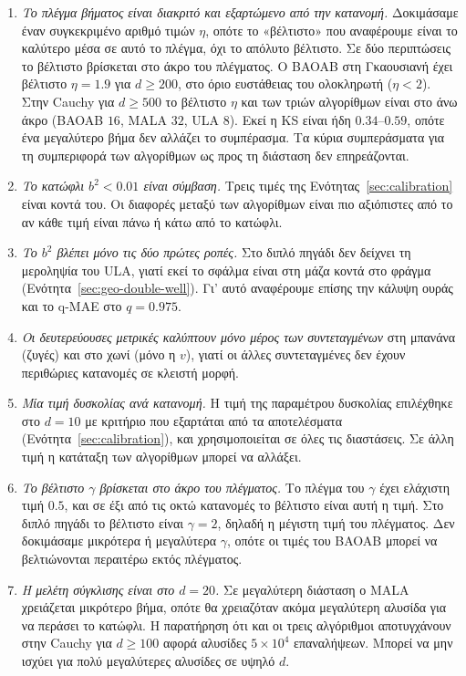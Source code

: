 \begin{enumerate}
  \item \emph{Το πλέγμα βήματος είναι διακριτό και εξαρτώμενο από την κατανομή.} Δοκιμάσαμε έναν
        συγκεκριμένο αριθμό τιμών $\eta$, οπότε το «βέλτιστο» που αναφέρουμε
        είναι το καλύτερο μέσα σε αυτό το πλέγμα, όχι το απόλυτο βέλτιστο.
        Σε δύο περιπτώσεις το βέλτιστο βρίσκεται στο άκρο του πλέγματος. Ο
        BAOAB στη Γκαουσιανή έχει βέλτιστο $\eta = 1.9$ για $d \ge 200$, στο
        όριο ευστάθειας του ολοκληρωτή ($\eta < 2$). Στην Cauchy για
        $d \ge 500$ το βέλτιστο $\eta$ και των τριών αλγορίθμων είναι στο
        άνω άκρο (BAOAB $16$, MALA $32$, ULA $8$). Εκεί η KS είναι ήδη
        $0.34$--$0.59$, οπότε ένα μεγαλύτερο βήμα δεν αλλάζει το συμπέρασμα.
        Τα κύρια συμπεράσματα για τη συμπεριφορά των αλγορίθμων ως προς τη
        διάσταση δεν επηρεάζονται.

  \item \emph{Το κατώφλι $b^2 < 0.01$ είναι σύμβαση.} Τρεις τιμές της
        Ενότητας~\ref{sec:calibration} είναι κοντά του. Οι διαφορές μεταξύ
        των αλγορίθμων είναι πιο αξιόπιστες από το αν κάθε τιμή είναι πάνω ή κάτω από το
        κατώφλι.

  \item \emph{Το $b^2$ βλέπει μόνο τις δύο πρώτες ροπές.} Στο διπλό πηγάδι δεν
        δείχνει τη μεροληψία του ULA, γιατί εκεί το σφάλμα είναι στη μάζα κοντά στο
        φράγμα (Ενότητα~\ref{sec:geo-double-well}). Γι' αυτό αναφέρουμε επίσης την
        κάλυψη ουράς και το q-MAE στο $q=0.975$.

  \item \emph{Οι δευτερεύουσες μετρικές καλύπτουν μόνο μέρος των συντεταγμένων} στη
        μπανάνα (ζυγές) και στο χωνί (μόνο η $v$), γιατί οι άλλες συντεταγμένες δεν
        έχουν περιθώριες κατανομές σε κλειστή μορφή.

  \item \emph{Μία τιμή δυσκολίας ανά κατανομή.} Η τιμή της παραμέτρου δυσκολίας
        επιλέχθηκε στο $d=10$ με κριτήριο που εξαρτάται από τα αποτελέσματα
        (Ενότητα~\ref{sec:calibration}), και χρησιμοποιείται σε όλες τις διαστάσεις.
        Σε άλλη τιμή η κατάταξη των αλγορίθμων μπορεί να αλλάξει.

  \item \emph{Το βέλτιστο $\gamma$ βρίσκεται στο άκρο του πλέγματος.} Το πλέγμα του $\gamma$
        έχει ελάχιστη τιμή $0.5$, και σε έξι από τις οκτώ κατανομές το βέλτιστο είναι
        αυτή η τιμή. Στο διπλό πηγάδι το βέλτιστο είναι $\gamma=2$, δηλαδή η μέγιστη
        τιμή του πλέγματος. Δεν δοκιμάσαμε μικρότερα
        ή μεγαλύτερα $\gamma$, οπότε οι τιμές του BAOAB μπορεί να βελτιώνονται
        περαιτέρω εκτός πλέγματος.

  \item \emph{Η μελέτη σύγκλισης είναι στο $d=20$.} Σε μεγαλύτερη διάσταση ο MALA χρειάζεται μικρότερο βήμα,
        οπότε θα χρειαζόταν ακόμα μεγαλύτερη αλυσίδα για να περάσει το κατώφλι. Η
        παρατήρηση ότι και οι τρεις αλγόριθμοι αποτυγχάνουν στην Cauchy για
        $d \ge 100$ αφορά αλυσίδες $5 \times 10^4$ επαναλήψεων. Μπορεί να μην ισχύει
        για πολύ μεγαλύτερες αλυσίδες σε υψηλό $d$.

\end{enumerate}

